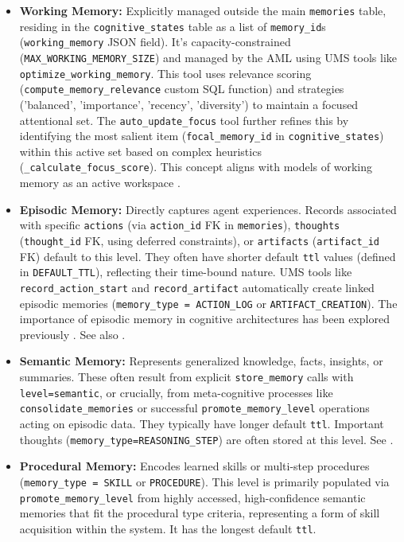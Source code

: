 \documentclass[12pt,a4paper]{article}
\newcommand{\code}[1]{\nolinkurl{#1}}
\begin{document}
\begin{itemize}
    \item \textbf{Working Memory:} Explicitly managed outside the main \code{memories} table, residing in the \code{cognitive\_states} table as a list of \code{memory\_id}s (\code{working\_memory} JSON field). It's capacity-constrained (\code{MAX\_WORKING\_MEMORY\_SIZE}) and managed by the AML using UMS tools like \code{optimize\_working\_memory}. This tool uses relevance scoring (\code{compute\_memory\_relevance} custom SQL function) and strategies ('balanced', 'importance', 'recency', 'diversity') to maintain a focused attentional set. The \code{auto\_update\_focus} tool further refines this by identifying the most salient item (\code{focal\_memory\_id} in \code{cognitive\_states}) within this active set based on complex heuristics (\code{\_calculate\_focus\_score}). This concept aligns with models of working memory as an active workspace \cite{Ref4}.

    \item \textbf{Episodic Memory:} Directly captures agent experiences. Records associated with specific \code{actions} (via \code{action\_id} FK in \code{memories}), \code{thoughts} (\code{thought\_id} FK, using deferred constraints), or \code{artifacts} (\code{artifact\_id} FK) default to this level. They often have shorter default \code{ttl} values (defined in \code{DEFAULT\_TTL}), reflecting their time-bound nature. UMS tools like \code{record\_action\_start} and \code{record\_artifact} automatically create linked episodic memories (\code{memory\_type = ACTION\_LOG} or \code{ARTIFACT\_CREATION}). The importance of episodic memory in cognitive architectures has been explored previously \cite{Ref11, Ref7}. See also \cite{Ref19}.

    \item \textbf{Semantic Memory:} Represents generalized knowledge, facts, insights, or summaries. These often result from explicit \code{store\_memory} calls with \code{level=semantic}, or crucially, from meta-cognitive processes like \code{consolidate\_memories} or successful \code{promote\_memory\_level} operations acting on episodic data. They typically have longer default \code{ttl}. Important thoughts (\code{memory\_type=REASONING\_STEP}) are often stored at this level. See \cite{Ref19}.

    \item \textbf{Procedural Memory:} Encodes learned skills or multi-step procedures (\code{memory\_type = SKILL} or \code{PROCEDURE}). This level is primarily populated via \code{promote\_memory\_level} from highly accessed, high-confidence semantic memories that fit the procedural type criteria, representing a form of skill acquisition within the system. It has the longest default \code{ttl}.
\end{itemize}
\end{document}
